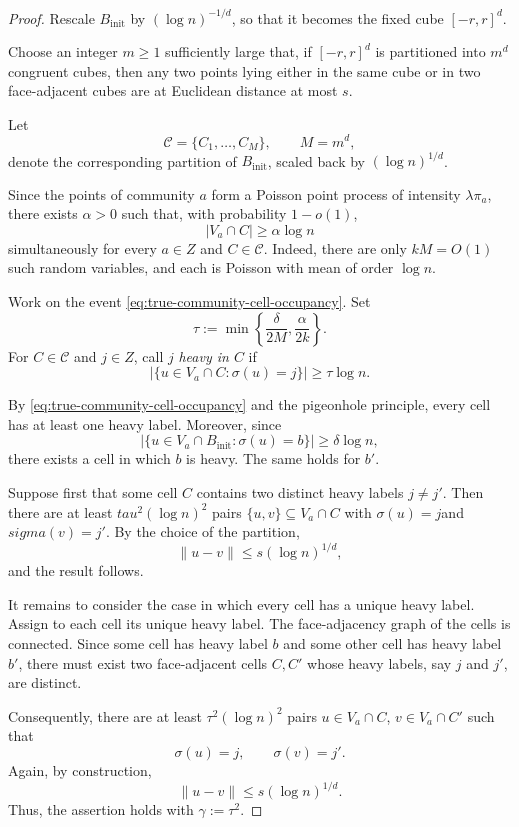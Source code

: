 \documentclass[11pt, a4paper]{amsart}
\newcommand{\1}{\mathbf{1}}
\theoremstyle{definition}
\theoremstyle{remark}
\theoremstyle{definition}
\begin{document}
\begin{proof}
Rescale $B_{\mathrm{init}}$ by $(\log n)^{-1/d}$, so that it
becomes the fixed cube $[-r,r]^d$.

Choose an integer $m\geq1$ sufficiently large that, if
$[-r,r]^d$ is partitioned into $m^d$ congruent cubes, then any two
points lying either in the same cube or in two face-adjacent cubes
are at Euclidean distance at most $s$.

Let
\[
\mathcal C=\{C_1,\ldots,C_M\},
\qquad M=m^d,
\]
denote the corresponding partition of $B_{\mathrm{init}}$, scaled
back by $(\log n)^{1/d}$.

Since the points of community $a$ form a Poisson point process of
intensity $\lambda\pi_a$, there exists $\alpha>0$ such that, with
probability $1-o(1)$,
\begin{equation}
\label{eq:true-community-cell-occupancy}
|V_a\cap C|
\geq
\alpha\log n
\end{equation}
simultaneously for every $a\in Z$ and $C\in\mathcal C$.
Indeed, there are only $kM=O(1)$ such random variables, and each is
Poisson with mean of order $\log n$.

Work on the event \eqref{eq:true-community-cell-occupancy}. Set
\[
\tau
:=
\min\left\{
\frac{\delta}{2M},
\frac{\alpha}{2k}
\right\}.
\]
For $C\in\mathcal C$ and $j\in Z$, call $j$ \emph{heavy in $C$} if
\[
\left|
\{u\in V_a\cap C:\sigma(u)=j\}
\right|
\geq
\tau\log n.
\]

By \eqref{eq:true-community-cell-occupancy} and the pigeonhole
principle, every cell has at least one heavy label. Moreover, since
\[
\left|
\{u\in V_a\cap B_{\mathrm{init}}:\sigma(u)=b\}
\right|
\geq\delta\log n,
\]
there exists a cell in which $b$ is heavy. The same holds for $b'$.

Suppose first that some cell $C$ contains two distinct heavy labels
$j\neq j'$. Then there are at least $tau^2(\log n)^2$ pairs $\{u,v\}\subseteq V_a\cap C$ with $\sigma(u)=j$and $sigma(v)=j'$.
By the choice of the partition,
\[
\|u-v\|
\leq
s(\log n)^{1/d},
\]
and the result follows.

It remains to consider the case in which every cell has a unique
heavy label. Assign to each cell its unique heavy label. The
face-adjacency graph of the cells is connected. Since some cell has
heavy label $b$ and some other cell has heavy label $b'$, there must
exist two face-adjacent cells $C,C'$ whose heavy labels, say $j$ and
$j'$, are distinct.

Consequently, there are at least $\tau^2(\log n)^2$ pairs
$u\in V_a\cap C$, $v\in V_a\cap C'$ such that
\[
\sigma(u)=j,
\qquad
\sigma(v)=j'.
\]
Again, by construction,
\[
\|u-v\|
\leq
s(\log n)^{1/d}.
\]
Thus, the assertion holds with $\gamma:=\tau^2$.
\end{proof}
\end{document}
